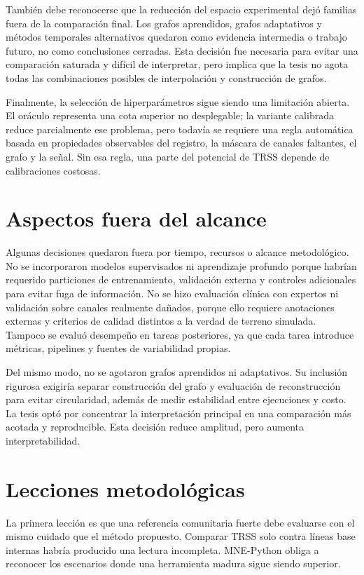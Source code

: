También debe reconocerse que la reducción del espacio experimental dejó familias fuera de la comparación final. Los grafos aprendidos, grafos adaptativos y métodos temporales alternativos quedaron como evidencia intermedia o trabajo futuro, no como conclusiones cerradas. Esta decisión fue necesaria para evitar una comparación saturada y difícil de interpretar, pero implica que la tesis no agota todas las combinaciones posibles de interpolación y construcción de grafos.

Finalmente, la selección de hiperparámetros sigue siendo una limitación abierta. El oráculo representa una cota superior no desplegable; la variante calibrada reduce parcialmente ese problema, pero todavía se requiere una regla automática basada en propiedades observables del registro, la máscara de canales faltantes, el grafo y la señal. Sin esa regla, una parte del potencial de TRSS depende de calibraciones costosas.

\section{Aspectos fuera del alcance}

Algunas decisiones quedaron fuera por tiempo, recursos o alcance metodológico. No se incorporaron modelos supervisados ni aprendizaje profundo porque habrían requerido particiones de entrenamiento, validación externa y controles adicionales para evitar fuga de información. No se hizo evaluación clínica con expertos ni validación sobre canales realmente dañados, porque ello requiere anotaciones externas y criterios de calidad distintos a la verdad de terreno simulada. Tampoco se evaluó desempeño en tareas posteriores, ya que cada tarea introduce métricas, pipelines y fuentes de variabilidad propias.

Del mismo modo, no se agotaron grafos aprendidos ni adaptativos. Su inclusión rigurosa exigiría separar construcción del grafo y evaluación de reconstrucción para evitar circularidad, además de medir estabilidad entre ejecuciones y costo. La tesis optó por concentrar la interpretación principal en una comparación más acotada y reproducible. Esta decisión reduce amplitud, pero aumenta interpretabilidad.

\section{Lecciones metodológicas}

La primera lección es que una referencia comunitaria fuerte debe evaluarse con el mismo cuidado que el método propuesto. Comparar TRSS solo contra líneas base internas habría producido una lectura incompleta. MNE-Python obliga a reconocer los escenarios donde una herramienta madura sigue siendo superior.

